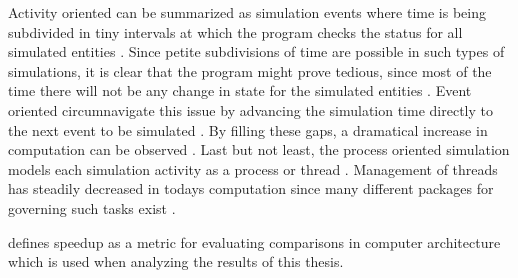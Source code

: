 Activity oriented can be summarized as simulation events where time is being subdivided in tiny intervals at which the program checks the status for all simulated entities \citep{Matloff2008}. Since petite subdivisions of time are possible in such types of simulations, it is clear that the program might prove tedious, since most of the time there will not be any change in state for the simulated entities \citep{Matloff2008}. Event oriented circumnavigate this issue by advancing the simulation time directly to the next event to be simulated \citep{Matloff2008}. By filling these gaps, a dramatical increase in computation can be observed \citep{Matloff2008}. Last but not least, the process oriented simulation models each simulation activity as a process or thread \citep{Matloff2008}. Management of threads has steadily decreased in todays computation since many different packages for governing such tasks exist \citep{Matloff2008}.

\citet{Milo2012} defines speedup as a metric for evaluating comparisons in computer architecture which is used when analyzing the results of this thesis.